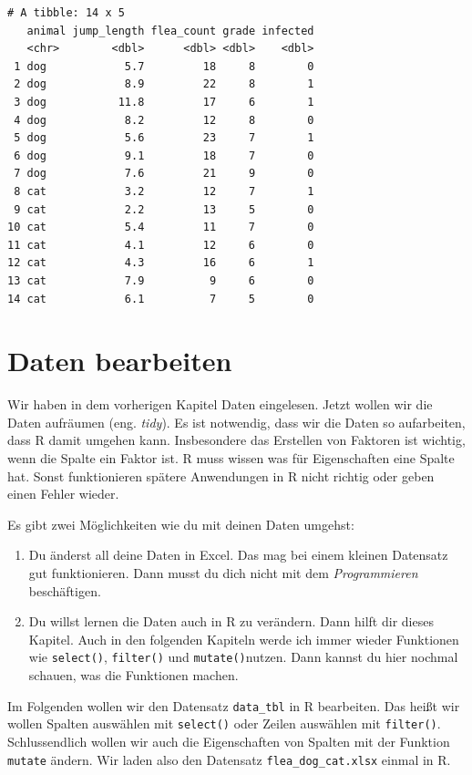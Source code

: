 \documentclass[
  letterpaper,
  DIV=11,
  oneside]{scrreport}
\providecommand{\tightlist}{%
  \setlength{\itemsep}{0pt}\setlength{\parskip}{0pt}}\usepackage{longtable,booktabs,array}
\begin{document}
\begin{verbatim}
# A tibble: 14 x 5
   animal jump_length flea_count grade infected
   <chr>        <dbl>      <dbl> <dbl>    <dbl>
 1 dog            5.7         18     8        0
 2 dog            8.9         22     8        1
 3 dog           11.8         17     6        1
 4 dog            8.2         12     8        0
 5 dog            5.6         23     7        1
 6 dog            9.1         18     7        0
 7 dog            7.6         21     9        0
 8 cat            3.2         12     7        1
 9 cat            2.2         13     5        0
10 cat            5.4         11     7        0
11 cat            4.1         12     6        0
12 cat            4.3         16     6        1
13 cat            7.9          9     6        0
14 cat            6.1          7     5        0
\end{verbatim}

\hypertarget{sec-dplyr}{%
\chapter{Daten bearbeiten}\label{sec-dplyr}}

Wir haben in dem vorherigen Kapitel Daten eingelesen. Jetzt wollen wir
die Daten aufräumen (eng. \emph{tidy}). Es ist notwendig, dass wir die
Daten so aufarbeiten, dass R damit umgehen kann. Insbesondere das
Erstellen von Faktoren ist wichtig, wenn die Spalte ein Faktor ist. R
muss wissen was für Eigenschaften eine Spalte hat. Sonst funktionieren
spätere Anwendungen in R nicht richtig oder geben einen Fehler wieder.

Es gibt zwei Möglichkeiten wie du mit deinen Daten umgehst:

\begin{enumerate}
\def\labelenumi{\arabic{enumi})}
\tightlist
\item
  Du änderst all deine Daten in Excel. Das mag bei einem kleinen
  Datensatz gut funktionieren. Dann musst du dich nicht mit dem
  \emph{Programmieren} beschäftigen.
\item
  Du willst lernen die Daten auch in R zu verändern. Dann hilft dir
  dieses Kapitel. Auch in den folgenden Kapiteln werde ich immer wieder
  Funktionen wie \texttt{select()}, \texttt{filter()} und
  \texttt{mutate()}nutzen. Dann kannst du hier nochmal schauen, was die
  Funktionen machen.
\end{enumerate}

Im Folgenden wollen wir den Datensatz \texttt{data\_tbl} in R
bearbeiten. Das heißt wir wollen Spalten auswählen mit \texttt{select()}
oder Zeilen auswählen mit \texttt{filter()}. Schlussendlich wollen wir
auch die Eigenschaften von Spalten mit der Funktion \texttt{mutate}
ändern. Wir laden also den Datensatz \texttt{flea\_dog\_cat.xlsx} einmal
in R.
\end{document}
